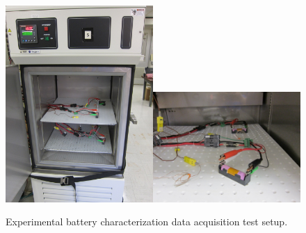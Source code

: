 \documentclass[]{aiaa-tc}%
\begin{document}
\begin{figure}[!htb]%
	\centering
	\includegraphics[width=0.5\textwidth, angle=90]{figures/ChamberFar.jpg}\includegraphics[width=0.5\textwidth]{figures/ChamberClose.jpg}
	\caption{Experimental battery characterization data acquisition test setup.}
	\label{fig:exp}
\end{figure}
\end{document}

